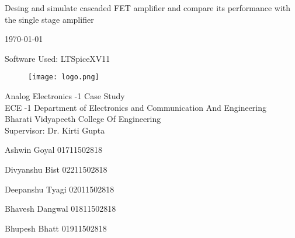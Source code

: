 \begin{titlepage}

\begin{center}

\Huge{Desing and simulate cascaded FET amplifier and compare its performance with the
single stage amplifier}
\vspace{10mm}

\small{\today}


\vspace{10mm}

\small{Software Used: LTSpiceXV11}

\begin{figure}[!h]
    \centering
    \texttt{[image: logo.png]}
  
\end{figure}

\vspace{30mm}

\small{Analog Electronics -1  Case Study \\ ECE -1}
\vspace{5mm}
 \small{Department of Electronics and Communication And Engineering\\
 Bharati Vidyapeeth College Of Engineering\\
 Supervisor: Dr. Kirti Gupta }

\end{center}
\begin{flushright}
    \small{Ashwin Goyal 01711502818}

\small{Divyanshu Bist 02211502818}

\small{Deepanshu Tyagi 02011502818}

\small{Bhavesh Dangwal 01811502818}

\small{Bhupesh Bhatt 01911502818}
\end{flushright}




\end{titlepage}
